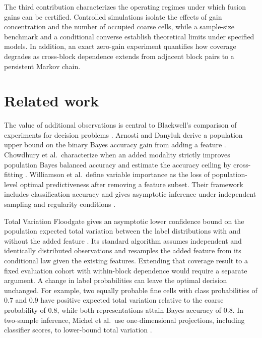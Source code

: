 \documentclass[preprint,11pt]{elsarticle}
\begin{document}
The third contribution characterizes the operating regimes under which fusion gains can be certified. Controlled simulations isolate the effects of gain concentration and the number of occupied coarse cells, while a sample-size benchmark and a conditional converse establish theoretical limits under specified models. In addition, an exact zero-gain experiment quantifies how coverage degrades as cross-block dependence extends from adjacent block pairs to a persistent Markov chain.

\section{Related work}

The value of additional observations is central to Blackwell's comparison of experiments for decision problems \cite{blackwell1953}. Arnosti and Danyluk derive a population upper bound on the binary Bayes accuracy gain from adding a feature \cite{arnosti2012feature}. Chowdhury et al.\ characterize when an added modality strictly improves population Bayes balanced accuracy and estimate the accuracy ceiling by cross-fitting \cite{chowdhury2026ceiling}. Williamson et al.\ define variable importance as the loss of population-level optimal predictiveness after removing a feature subset. Their framework includes classification accuracy and gives asymptotic inference under independent sampling and regularity conditions \cite{williamson2023importance}.

Total Variation Floodgate gives an asymptotic lower confidence bound on the population expected total variation between the label distributions with and without the added feature \cite{wang2024floodgate}. Its standard algorithm assumes independent and identically distributed observations and resamples the added feature from its conditional law given the existing features. Extending that coverage result to a fixed evaluation cohort with within-block dependence would require a separate argument. A change in label probabilities can leave the optimal decision unchanged. For example, two equally probable fine cells with class probabilities of 0.7 and 0.9 have positive expected total variation relative to the coarse probability of 0.8, while both representations attain Bayes accuracy of 0.8. In two-sample inference, Michel et al.\ use one-dimensional projections, including classifier scores, to lower-bound total variation \cite{michel2022tv}.
\end{document}
